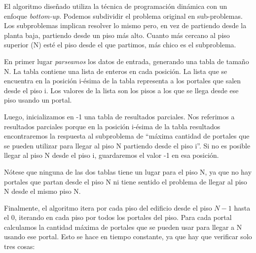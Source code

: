 El algoritmo diseñado utiliza la técnica de programación dinámica con un enfoque \textit{bottom-up}. Podemos subdividir el problema original en sub-problemas. Los subproblemas implican resolver lo mismo pero, en vez de partiendo desde la planta baja, partiendo desde un piso más alto. Cuanto más cercano al piso superior (N) esté el piso desde el que partimos, más chico es el subproblema.

En primer lugar \textit{parseamos} los datos de entrada, generando una tabla de tamaño N. La tabla contiene una lista de enteros en cada posición. La lista que se encuentra en la posición i-ésima de la tabla representa a los portales que salen desde el piso i. Los valores de la lista son los pisos a los que se llega desde ese piso usando un portal.

Luego, inicializamos en -1 una tabla de resultados parciales. Nos referimos a resultados parciales porque en la posición i-ésima de la tabla resultados encontraremos la respuesta al subproblema de ``máxima cantidad de portales que se pueden utilizar para llegar al piso N partiendo desde el piso i''. Si no es posible llegar al piso N desde el piso i, guardaremos el valor -1 en esa posición.

Nótese que ninguna de las dos tablas tiene un lugar para el piso N, ya que no hay portales que partan desde el piso N ni tiene sentido el problema de llegar al piso N desde el mismo piso N.

Finalmente, el algoritmo itera por cada piso del edificio desde el piso $N-1$ hasta el 0, iterando en cada piso por todos los portales del piso. Para cada portal calculamos la cantidad máxima de portales que se pueden usar para llegar a N usando ese portal. Esto se hace en tiempo constante, ya que hay que verificar solo tres cosas: 

